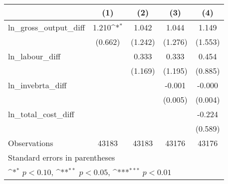 {
\def\sym#1{\ifmmode^{#1}\else\(^{#1}\)\fi}
\begin{tabular}{l*{4}{c}}
\hline\hline
                &\multicolumn{1}{c}{(1)}         &\multicolumn{1}{c}{(2)}         &\multicolumn{1}{c}{(3)}         &\multicolumn{1}{c}{(4)}         \\
\hline
ln\_gross\_output\_diff&    1.210\sym{*}  &    1.042         &    1.044         &    1.149         \\
                &  (0.662)         &  (1.242)         &  (1.276)         &  (1.553)         \\
[1em]
ln\_labour\_diff  &                  &    0.333         &    0.333         &    0.454         \\
                &                  &  (1.169)         &  (1.195)         &  (0.885)         \\
[1em]
ln\_invebrta\_diff&                  &                  &   -0.001         &   -0.000         \\
                &                  &                  &  (0.005)         &  (0.004)         \\
[1em]
ln\_total\_cost\_diff&                  &                  &                  &   -0.224         \\
                &                  &                  &                  &  (0.589)         \\
\hline
Observations    &    43183         &    43183         &    43176         &    43176         \\
\hline\hline
\multicolumn{5}{l}{\footnotesize Standard errors in parentheses}\\
\multicolumn{5}{l}{\footnotesize \sym{*} \(p<0.10\), \sym{**} \(p<0.05\), \sym{***} \(p<0.01\)}\\
\end{tabular}
}
